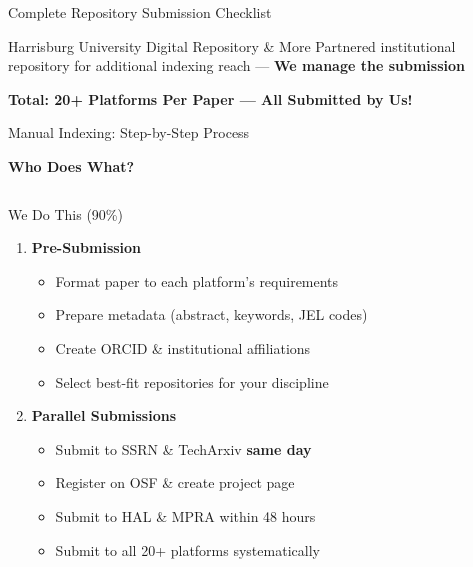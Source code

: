 \documentclass[10pt, aspectratio=169]{beamer}
\begin{document}
\begin{frame}{Complete Repository Submission Checklist}
		\vspace{0.3cm}
		\begin{block}{Harrisburg University Digital Repository \& More}
			\tiny Partnered institutional repository for additional indexing reach — \textcolor{mygreen}{\textbf{We manage the submission}}
		\end{block}
		
		\vspace{0.2cm}
		\begin{center}
			\textcolor{myblue}{\textbf{Total: 20+ Platforms Per Paper — All Submitted by Us!}}
		\end{center}
	\end{frame}
	
	\begin{frame}{Manual Indexing: Step-by-Step Process}
		\begin{center}
			\textcolor{myblue}{\Large \textbf{Who Does What?}}
		\end{center}
		
		\vspace{0.3cm}
		\begin{columns}[T]
			\begin{block}{\textcolor{myblue}{We Do This (90\%)}}
				\begin{enumerate}
					\item \textbf{Pre-Submission}
					\begin{itemize}
						\item Format paper to each platform's requirements
						\item Prepare metadata (abstract, keywords, JEL codes)
						\item Create ORCID \& institutional affiliations
						\item Select best-fit repositories for your discipline
					\end{itemize}
					
					\item \textbf{Parallel Submissions}
					\begin{itemize}
						\item Submit to SSRN \& TechArxiv \textbf{same day}
						\item Register on OSF \& create project page
						\item Submit to HAL \& MPRA within 48 hours
						\item Submit to all 20+ platforms systematically
					\end{itemize}
					

\end{enumerate}
\end{block}
\end{columns}
\end{frame}
\end{document}
